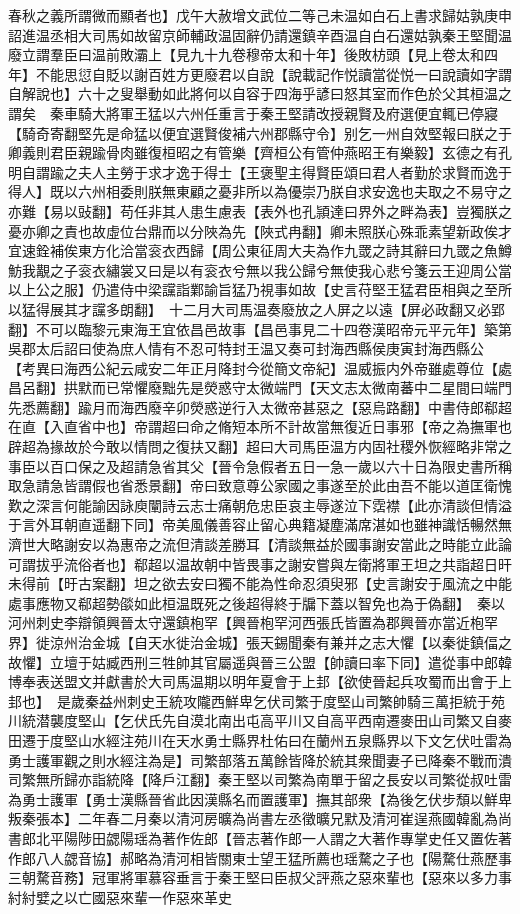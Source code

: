 春秋之義所謂微而顯者也】戊午大赦增文武位二等己未温如白石上書求歸姑孰庚申詔進温丞相大司馬如故留京師輔政温固辭仍請還鎮辛酉温自白石還姑孰秦王堅聞温廢立謂羣臣曰温前敗灞上【見九十九卷穆帝太和十年】後敗枋頭【見上卷太和四年】不能思愆自貶以謝百姓方更廢君以自說【說載記作悦讀當從悦一曰說讀如字謂自解說也】六十之叟舉動如此將何以自容于四海乎諺曰怒其室而作色於父其桓温之謂矣　秦車騎大將軍王猛以六州任重言于秦王堅請改授親賢及府選便宜輒已停寢【騎奇寄翻堅先是命猛以便宜選賢俊補六州郡縣守令】别乞一州自效堅報曰朕之于卿義則君臣親踰骨肉雖復桓昭之有管樂【齊桓公有管仲燕昭王有樂毅】玄德之有孔明自謂踰之夫人主勞于求才逸于得士【王褒聖主得賢臣頌曰君人者勤於求賢而逸于得人】既以六州相委則朕無東顧之憂非所以為優崇乃朕自求安逸也夫取之不易守之亦難【易以䜴翻】苟任非其人患生慮表【表外也孔頴達曰界外之畔為表】豈獨朕之憂亦卿之責也故虛位台鼎而以分陜為先【陜式冉翻】卿未照朕心殊乖素望新政俟才宜速銓補俟東方化洽當衮衣西歸【周公東征周大夫為作九罭之詩其辭曰九罭之魚鱒魴我覯之子衮衣繡裳又曰是以有衮衣兮無以我公歸兮無使我心悲兮箋云王迎周公當以上公之服】仍遣侍中梁讜詣鄴諭旨猛乃視事如故【史言苻堅王猛君臣相與之至所以猛得展其才讜多朗翻】　十二月大司馬温奏廢放之人屏之以遠【屏必政翻又必郢翻】不可以臨黎元東海王宜依昌邑故事【昌邑事見二十四卷漢昭帝元平元年】築第吳郡太后詔曰使為庶人情有不忍可特封王温又奏可封海西縣侯庚寅封海西縣公　【考異曰海西公紀云咸安二年正月降封今從簡文帝紀】温威振内外帝雖處尊位【處昌呂翻】拱默而已常懼廢黜先是熒惑守太微端門【天文志太微南蕃中二星間曰端門先悉薦翻】踰月而海西廢辛卯熒惑逆行入太微帝甚惡之【惡烏路翻】中書侍郎郗超在直【入直省中也】帝謂超曰命之脩短本所不計故當無復近日事邪【帝之為撫軍也辟超為掾故於今敢以情問之復扶又翻】超曰大司馬臣温方内固社稷外恢經略非常之事臣以百口保之及超請急省其父【晉令急假者五日一急一歲以六十日為限史書所稱取急請急皆謂假也省悉景翻】帝曰致意尊公家國之事遂至於此由吾不能以道匡衛愧歎之深言何能諭因詠庾闡詩云志士痛朝危忠臣哀主辱遂泣下霑襟【此亦清談但情溢于言外耳朝直遥翻下同】帝美風儀善容止留心典籍凝塵滿席湛如也雖神識恬暢然無濟世大略謝安以為惠帝之流但清談差勝耳【清談無益於國事謝安當此之時能立此論可謂拔乎流俗者也】郗超以温故朝中皆畏事之謝安嘗與左衛將軍王坦之共詣超日旰未得前【旴古案翻】坦之欲去安曰獨不能為性命忍須臾邪【史言謝安于風流之中能處事應物又郗超勢燄如此桓温既死之後超得終于牖下蓋以智免也為于偽翻】　秦以河州刺史李辯領興晉太守還鎮枹罕【興晉枹罕河西張氏皆置為郡興晉亦當近枹罕界】徙涼州治金城【自天水徙治金城】張天錫聞秦有兼并之志大懼【以秦徙鎮偪之故懼】立壇于姑臧西刑三牲帥其官屬遥與晉三公盟【帥讀曰率下同】遣從事中郎韓博奉表送盟文并獻書於大司馬温期以明年夏會于上邽【欲使晉起兵攻蜀而出會于上邽也】　是歲秦益州刺史王統攻隴西鮮卑乞伏司繁于度堅山司繁帥騎三萬拒統于苑川統潜襲度堅山【乞伏氏先自漠北南出屯高平川又自高平西南遷麥田山司繁又自麥田遷于度堅山水經注苑川在天水勇士縣界杜佑曰在蘭州五泉縣界以下文乞伏吐雷為勇士護軍觀之則水經注為是】司繁部落五萬餘皆降於統其衆聞妻子已降秦不戰而潰司繁無所歸亦詣統降【降戶江翻】秦王堅以司繁為南單于留之長安以司繁從叔吐雷為勇士護軍【勇士漢縣晉省此因漢縣名而置護軍】撫其部衆【為後乞伏步頹以鮮卑叛秦張本】二年春二月秦以清河房曠為尚書左丞徵曠兄默及清河崔逞燕國韓亂為尚書郎北平陽陟田勰陽瑶為著作佐郎【晉志著作郎一人謂之大著作專掌史任又置佐著作郎八人勰音協】郝略為清河相皆關東士望王猛所薦也瑶騖之子也【陽騖仕燕歷事三朝騖音務】冠軍將軍慕容垂言于秦王堅曰臣叔父評燕之惡來輩也【惡來以多力事紂紂嬖之以亡國惡來輩一作惡來革史